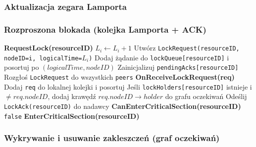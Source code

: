 \documentclass[12pt,a4paper]{article}
\begin{document}
	\subsubsection{Aktualizacja zegara Lamporta}
	\begin{algorithm}[H]
		\caption{Zegar logiczny Lamporta.}
	\end{algorithm}

	\subsubsection{Rozproszona blokada (kolejka Lamporta + ACK)}
	\begin{algorithm}[H]
		\textbf{RequestLock(resourceID)}\;
		$L_i \leftarrow L_i+1$\;
		Utwórz \texttt{LockRequest(resourceID, nodeID=i, logicalTime=$L_i$)}\;
		Dodaj żądanie do \texttt{lockQueue[resourceID]} i posortuj po $(logicalTime, nodeID)$\;
		Zainicjalizuj \texttt{pendingAcks[resourceID]}\;
		Rozgłoś \texttt{LockRequest} do wszystkich \texttt{peers}\;
		\BlankLine
		\textbf{OnReceiveLockRequest(req)}\;
		Dodaj \texttt{req} do lokalnej kolejki i posortuj\;
		Jeśli \texttt{lockHolders[resourceID]} istnieje i $\neq req.nodeID$, dodaj krawędź $req.nodeID \rightarrow holder$ do grafu oczekiwań\;
		Odeślij \texttt{LockAck(resourceID)} do nadawcy\;
		\BlankLine
		\textbf{CanEnterCriticalSection(resourceID)}\;
		\Return \texttt{false}\;
		\BlankLine
		\textbf{EnterCriticalSection(resourceID)}\;
		\caption{Rozproszona blokada zasobu.}
	\end{algorithm}

	\subsubsection{Wykrywanie i usuwanie zakleszczeń (graf oczekiwań)}
	\begin{algorithm}[H]
		\caption{Detekcja cyklu i wybór ofiary (master).}
	\end{algorithm}
\end{document}
